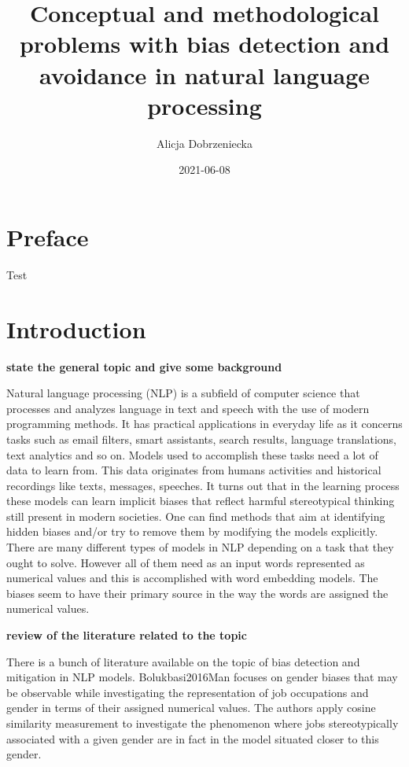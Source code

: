 \documentclass[]{book}
\title{Conceptual and methodological problems with bias detection and avoidance
in natural language processing}
\author{Alicja Dobrzeniecka}
\date{2021-06-08}
\begin{document}
\maketitle

{
\setcounter{tocdepth}{5}
\tableofcontents
}
\chapter*{Preface}\label{preface}

Test

\chapter{Introduction}\label{introduction}

\textbf{state the general topic and give some background}

Natural language processing (NLP) is a subfield of computer science that
processes and analyzes language in text and speech with the use of
modern programming methods. It has practical applications in everyday
life as it concerns tasks such as email filters, smart assistants,
search results, language translations, text analytics and so on. Models
used to accomplish these tasks need a lot of data to learn from. This
data originates from humans activities and historical recordings like
texts, messages, speeches. It turns out that in the learning process
these models can learn implicit biases that reflect harmful
stereotypical thinking still present in modern societies. One can find
methods that aim at identifying hidden biases and/or try to remove them
by modifying the models explicitly. There are many different types of
models in NLP depending on a task that they ought to solve. However all
of them need as an input words represented as numerical values and this
is accomplished with word embedding models. The biases seem to have
their primary source in the way the words are assigned the numerical
values. \newline

\textbf{review of the literature related to the topic}

There is a bunch of literature available on the topic of bias detection
and mitigation in NLP models. Bolukbasi2016Man focuses on gender biases
that may be observable while investigating the representation of job
occupations and gender in terms of their assigned numerical values. The
authors apply cosine similarity measurement to investigate the
phenomenon where jobs stereotypically associated with a given gender are
in fact in the model situated closer to this gender.
\end{document}
